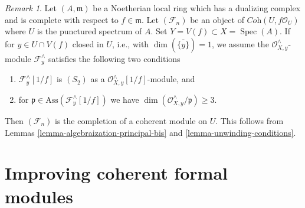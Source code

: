 \documentclass{stacks-project}
\theoremstyle{plain}
\theoremstyle{definition}
\theoremstyle{remark}
\newtheorem{remark}[subsection]{Remark}
\numberwithin{equation}{subsection}
\def\Spec{\mathop{\mathrm{Spec}}}
\begin{document}
\begin{remark}
\label{remark-interesting-case-bis}
Let $(A, \mathfrak m)$ be a Noetherian local ring which has a
dualizing complex and is complete with respect to $f \in \mathfrak m$.
Let $(\mathcal{F}_n)$ be an object of $\textit{Coh}(U, f\mathcal{O}_U)$
where $U$ is the punctured spectrum of $A$.
Set $Y = V(f) \subset X = \Spec(A)$.
If for $y \in U \cap V(f)$ closed in $U$, i.e., with
$\dim(\overline{\{y\}}) = 1$, we assume the
$\mathcal{O}_{X, y}^\wedge$-module $\mathcal{F}_y^\wedge$
satisfies the following two conditions
\begin{enumerate}
\item $\mathcal{F}_y^\wedge[1/f]$ is $(S_2)$ as a
$\mathcal{O}_{X, y}^\wedge[1/f]$-module, and
\item for $\mathfrak p \in \text{Ass}(\mathcal{F}_y^\wedge[1/f])$
we have $\dim(\mathcal{O}_{X, y}^\wedge/\mathfrak p) \geq 3$.
\end{enumerate}
Then $(\mathcal{F}_n)$ is the completion of a coherent module on $U$.
This follows from Lemmas \ref{lemma-algebraization-principal-bis}
and \ref{lemma-unwinding-conditions}.
\end{remark}
































\section{Improving coherent formal modules}
\label{section-improving-formal-modules}
\end{document}
